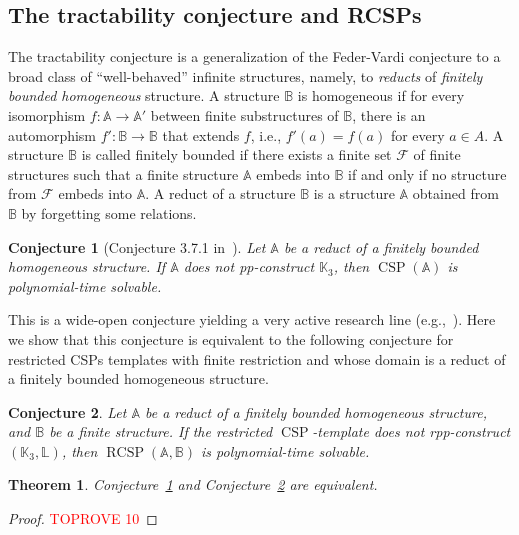 \documentclass{article}
\newtheorem{theorem}{Theorem}
\newtheorem{conjecture}{Conjecture}
\theoremstyle{definition}
\theoremstyle{remark}
\DeclareMathOperator{\CSP}{CSP}
\DeclareMathOperator{\RCSP}{RCSP}
\newcommand{\bA}{{\mathbb A}}
\newcommand{\bB}{{\mathbb B}}
\newcommand{\bK}{{\mathbb K}}
\newcommand{\bL}{{\mathbb L}}
\begin{document}
\subsection{The tractability conjecture and RCSPs}

The tractability conjecture is a generalization of the Feder-Vardi conjecture to a broad class
of  ``well-behaved'' infinite structures, namely, to \emph{reducts} of
\emph{finitely bounded homogeneous} structure. A structure $\bB$ is homogeneous if for
every isomorphism $f\colon \bA \to\bA'$ between finite substructures of $\bB$, there is
an automorphism  $f'\colon \bB\to \bB$ that extends $f$,  i.e., $f'(a) = f(a)$ for every
$a\in A$. A structure $\bB$ is called finitely bounded  if there exists a finite set
${\mathcal F}$ of finite structures such that a finite structure $\bA$ embeds into $\bB$
if and only if no structure from ${\mathcal F}$ embeds into $\bA$. A reduct
of a structure $\bB$ is a structure $\bA$ obtained from $\bB$ by forgetting some relations.

\begin{conjecture}
[Conjecture 3.7.1 in~\cite{Book}]
\label{conj:tractability}
Let $\bA$ be a reduct of a finitely bounded homogeneous structure. If $\bA$ does not pp-construct
$\bK_3$, then $\CSP(\bA)$ is polynomial-time solvable. 
\end{conjecture}

This is a wide-open conjecture yielding a very active research line (e.g.,~\cite{wonderland,BKOPP,BartoPinskerDichotomy,Book,BodirskyBodorUIP,BodDalJournal,Pinsker22}).
Here we show that this conjecture is equivalent to the following conjecture for restricted CSPs
templates with finite restriction and whose domain is a reduct of a finitely bounded homogeneous structure.

\begin{conjecture}\label{conj:red-FB-homogeneous}
    Let $\bA$ be a reduct of a finitely bounded homogeneous structure, and $\bB$ be a finite
    structure.  If the restricted $\CSP$-template does not rpp-construct $(\bK_3,\bL)$, then
    $\RCSP(\bA,\bB)$ is polynomial-time solvable.
\end{conjecture}

\begin{theorem}
    Conjecture~\ref{conj:tractability} and Conjecture~\ref{conj:red-FB-homogeneous} are equivalent.
\end{theorem}
\begin{proof}\textcolor{red}{TOPROVE 10}\end{proof}
\end{document}
